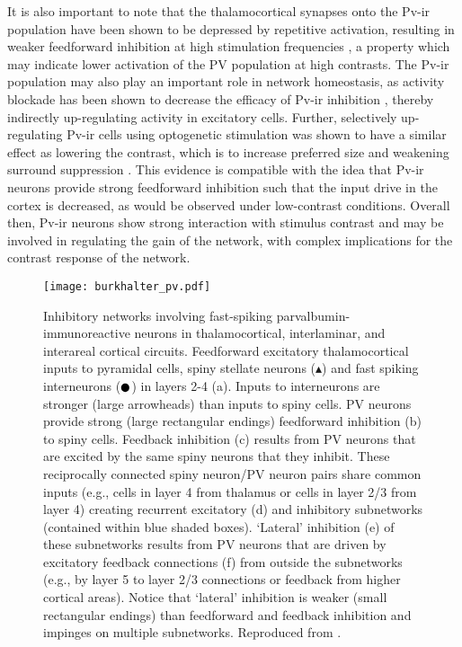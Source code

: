 It is also important to note that the thalamocortical synapses onto
the Pv-ir population have been shown to be depressed by repetitive
activation, resulting in weaker feedforward inhibition at high
stimulation frequencies \citep{Gabernet2005}, a property which may
indicate lower activation of the PV population at high contrasts. The
Pv-ir population may also play an important role in network
homeostasis, as activity blockade has been shown to decrease the
efficacy of Pv-ir inhibition \citep{Bartley2008}, thereby indirectly
up-regulating activity in excitatory cells. Further, selectively
up-regulating Pv-ir cells using optogenetic stimulation was shown to
have a similar effect as lowering the contrast, which is to increase
preferred size and weakening surround suppression
\citep{Nienborg2013}. This evidence is compatible with the idea that Pv-ir
neurons provide strong feedforward inhibition such that the input
drive in the cortex is decreased, as would be observed under 
low-contrast conditions. Overall then, Pv-ir neurons show strong
interaction with stimulus contrast and may be involved in regulating
the gain of the network, with complex implications for the contrast
response of the network.

\begin{figure}
	\centering
        \texttt{[image: burkhalter\_pv.pdf]}
	\caption[Proposed inhibitory circuit for feedforward inhibition
      mediated by PV cells. Reproduced from
      \cite{Burkhalter2008}.]{Inhibitory networks involving
      fast-spiking parvalbumin-immunoreactive neurons in
      thalamocortical, interlaminar, and interareal cortical
      circuits. Feedforward excitatory thalamocortical inputs to
      pyramidal cells, spiny stellate neurons ($\blacktriangle$) and
      fast spiking interneurons ($\newmoon$) in layers 2-4 (a). Inputs
      to interneurons are stronger (large arrowheads) than inputs to
      spiny cells. PV neurons provide strong (large rectangular
      endings) feedforward inhibition (b) to spiny cells. Feedback
      inhibition (c) results from PV neurons that are excited by the
      same spiny neurons that they inhibit. These reciprocally
      connected spiny neuron/PV neuron pairs share common inputs
      (e.g., cells in layer 4 from thalamus or cells in layer 2/3 from
      layer 4) creating recurrent excitatory (d) and inhibitory
      subnetworks (contained within blue shaded boxes). ‘Lateral’
      inhibition (e) of these subnetworks results from PV neurons that
      are driven by excitatory feedback connections (f) from outside
      the subnetworks (e.g., by layer 5 to layer 2/3 connections or
      feedback from higher cortical areas). Notice that ‘lateral’
      inhibition is weaker (small rectangular endings) than
      feedforward and feedback inhibition and impinges on multiple
      subnetworks. Reproduced from \cite{Burkhalter2008}.}
	\label{burkhalterpv}
\end{figure}


